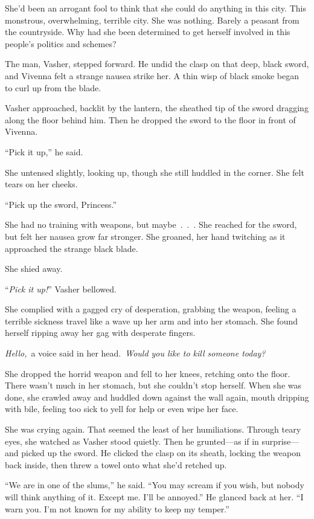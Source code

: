 She’d been an arrogant fool to think that she could do anything in this city. This monstrous, overwhelming, terrible city. She was nothing. Barely a peasant from the countryside. Why had she been determined to get herself involved in this people’s politics and schemes?

The man, Vasher, stepped forward. He undid the clasp on that deep, black sword, and Vivenna felt a strange nausea strike her. A thin wisp of black smoke began to curl up from the blade.

Vasher approached, backlit by the lantern, the sheathed tip of the sword dragging along the floor behind him. Then he dropped the sword to the floor in front of Vivenna.

“Pick it up,” he said.

She untensed slightly, looking up, though she still huddled in the corner. She felt tears on her cheeks.

“Pick up the sword, Princess.”

She had no training with weapons, but maybe~.~.~. She reached for the sword, but felt her nausea grow far stronger. She groaned, her hand twitching as it approached the strange black blade.

She shied away.

“\textit{Pick it up!}” Vasher bellowed.

She complied with a gagged cry of desperation, grabbing the weapon, feeling a terrible sickness travel like a wave up her arm and into her stomach. She found herself ripping away her gag with desperate fingers.

\textit{Hello,}~a voice said in her head.~\textit{Would you like to kill someone today?}

She dropped the horrid weapon and fell to her knees, retching onto the floor. There wasn’t much in her stomach, but she couldn’t stop herself. When she was done, she crawled away and huddled down against the wall again, mouth dripping with bile, feeling too sick to yell for help or even wipe her face.

She was crying again. That seemed the least of her humiliations. Through teary eyes, she watched as Vasher stood quietly. Then he grunted—as if in surprise—and picked up the sword. He clicked the clasp on its sheath, locking the weapon back inside, then threw a towel onto what she’d retched up.

“We are in one of the slums,” he said. “You may scream if you wish, but nobody will think anything of it. Except me. I’ll be annoyed.” He glanced back at her. “I warn you. I’m not known for my ability to keep my temper.”

